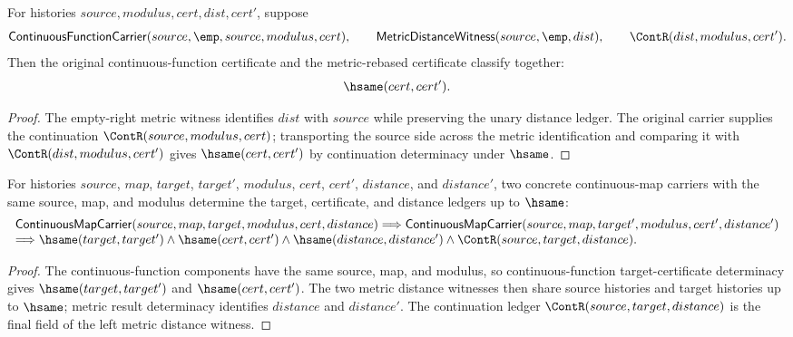 \begin{theorem}
\label{thm:continuousmap-empty-target-metric-cert-deterministic}
For histories $source,modulus,cert,dist,cert'$, suppose
$$
\mathsf{ContinuousFunctionCarrier}(source,\emp,source,modulus,cert),
\qquad
\mathsf{MetricDistanceWitness}(source,\emp,dist),
\qquad
\ContR(dist,modulus,cert').
$$
Then the original continuous-function certificate and the metric-rebased
certificate classify together:
$$
\hsame(cert,cert').
$$
\end{theorem}
\begin{proof}
The empty-right metric witness identifies $dist$ with $source$ while preserving
the unary distance ledger. The original carrier supplies the continuation
$\ContR(source,modulus,cert)$; transporting the source side across the metric
identification and comparing it with $\ContR(dist,modulus,cert')$ gives
$\hsame(cert,cert')$ by continuation determinacy under $\hsame$.
\end{proof}

\begin{theorem}
\label{thm:continuousmap-target-cert-distance-deterministic}
For histories $source$, $map$, $target$, $target'$, $modulus$, $cert$, $cert'$,
$distance$, and $distance'$, two concrete continuous-map carriers with the same
source, map, and modulus determine the target, certificate, and distance
ledgers up to $\hsame$:
$$
\begin{array}{l}
\mathsf{ContinuousMapCarrier}(source,map,target,modulus,cert,distance)
\Longrightarrow
\mathsf{ContinuousMapCarrier}(source,map,target',modulus,cert',distance')
\\
\Longrightarrow
\hsame(target,target')\land\hsame(cert,cert')\land
\hsame(distance,distance')\land\ContR(source,target,distance).
\end{array}
$$
\end{theorem}
\begin{proof}
The continuous-function components have the same source, map, and modulus, so
continuous-function target-certificate determinacy gives
$\hsame(target,target')$ and $\hsame(cert,cert')$. The two metric distance
witnesses then share source histories and target histories up to $\hsame$;
metric result determinacy identifies $distance$ and $distance'$. The
continuation ledger $\ContR(source,target,distance)$ is the final field of the
left metric distance witness.
\end{proof}

